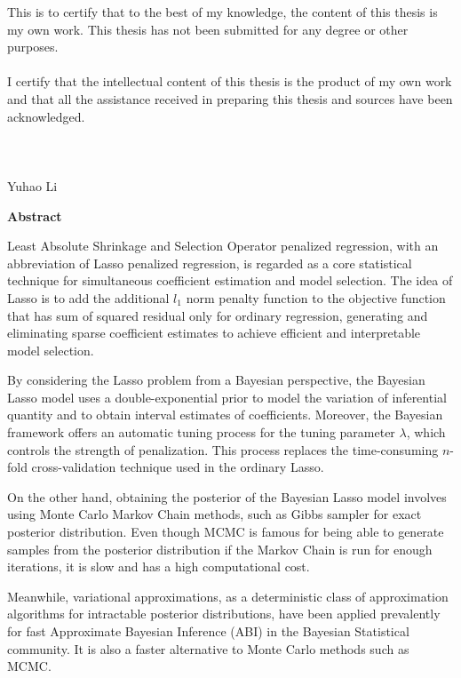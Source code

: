 \noindent This is to certify that to the best of my knowledge, the content of this thesis is my own work. This thesis has not been submitted for any degree or other purposes.\\
\\
\noindent I certify that the intellectual content of this thesis is the product of my own work and that all the assistance received in preparing this thesis and sources have been acknowledged.\\
\\
\\
\\
Yuhao Li

\pagebreak
\hspace{0pt}

\begin{center}
    \textbf{\large Abstract }\\
    \vspace{0.5cm}
\end{center}
Least Absolute Shrinkage and Selection Operator penalized regression, with an abbreviation of Lasso penalized regression, is regarded as a core statistical technique for simultaneous coefficient estimation and model selection. The idea of Lasso is to add the additional $l_1$ norm penalty function to the objective function that has sum of squared residual only for ordinary regression, generating and eliminating sparse coefficient estimates to achieve efficient and interpretable model selection.

By considering the Lasso problem from a Bayesian perspective, the Bayesian Lasso model uses a double-exponential prior to model the variation of inferential quantity and to obtain interval estimates of coefficients. Moreover, the Bayesian framework offers an automatic tuning process for the tuning parameter $\lambda$, which controls the strength of penalization. This process replaces the time-consuming $n$-fold cross-validation technique used in the ordinary Lasso.

On the other hand, obtaining the posterior of the Bayesian Lasso model involves using Monte Carlo Markov Chain methods, such as Gibbs sampler for exact posterior distribution. Even though MCMC is famous for being able to generate 
samples from the posterior distribution if the Markov Chain is run for enough iterations, it is slow and has a high computational cost. 

Meanwhile, variational approximations, as a deterministic class of approximation algorithms for intractable posterior distributions, have been applied prevalently for fast Approximate Bayesian Inference (ABI) in the Bayesian Statistical community. It is also a faster alternative to Monte Carlo methods such as MCMC.

